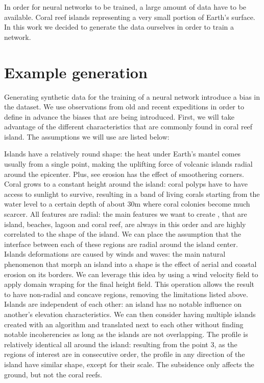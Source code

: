 In order for neural networks to be trained, a large amount of data have to be available. Coral reef islands representing a very small portion of  Earth's surface. In this work we decided to generate the data ourselves in order to train a network. 

\section{Example generation}
\label{sec:coral-island_example-generation}
Generating synthetic data for the training of a neural network introduce a bias in the dataset. We use observations from old and recent expeditions in order to define in advance the biases that are being introduced. First, we will take advantage of the different characteristics that are commonly found in coral reef island. The assumptions we will use are listed below:
\begin{enumerate}
    \Item{} Islands have a relatively round shape: the heat under Earth's mantel comes usually from a single point, making the uplifting force of volcanic islands radial around the epicenter. Plus, see erosion has the effect of smoothering corners.
    \Item{} Coral grows to a constant height around the island: coral polyps have to have access to sunlight to survive, resulting in a band of living corals starting from the water level to a certain depth of about 30m where coral colonies become much scarcer. 
    \Item{} All features are radial: the main features we want to create , that are island, beaches, lagoon and coral reef, are always in this order and are highly correlated to the shape of the island. We can place the assumption that the interface between each of these regions are radial around the island center.
    \Item{} Islands deformations are caused by winds and waves: the main natural phenomenon that morph an island into a shape is the effect of aerial and coastal erosion on its borders. We can leverage this idea by using a wind velocity field to apply domain wraping for the final height field. This operation allows the result to have non-radial and concave regions, removing the limitations listed above.
    \Item{} Islands are independent of each other: an island has no notable influence on another's elevation characteristics. We can then consider having multiple islands created with an algorithm and translated next to each other without finding notable incoherencies as long as the islands are not overlapping.
    \Item{} The profile is relatively identical all around the island: resulting from the point 3, as the regions of interest are in consecutive order, the profile in any direction of the island have similar shape, except for their scale.
    \Item{} The subsidence only affects the ground, but not the coral reefs.
\end{enumerate}

